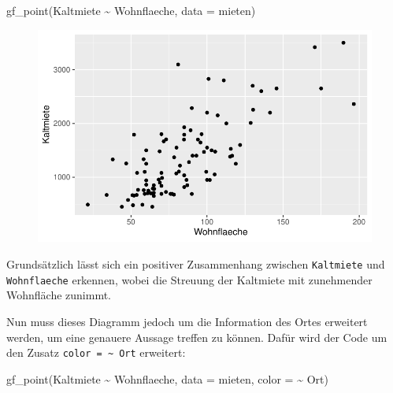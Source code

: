 \documentclass[
  a4paper,
  DIV=11]{scrartcl}
\newenvironment{Shaded}{\begin{snugshade}}{\end{snugshade}}
\newcommand{\AttributeTok}[1]{\textcolor[rgb]{0.40,0.45,0.13}{#1}}
\newcommand{\FunctionTok}[1]{\textcolor[rgb]{0.28,0.35,0.67}{#1}}
\newcommand{\NormalTok}[1]{\textcolor[rgb]{0.00,0.23,0.31}{#1}}
\newcommand{\SpecialCharTok}[1]{\textcolor[rgb]{0.37,0.37,0.37}{#1}}
\begin{document}
\begin{Shaded}
\begin{Highlighting}[]
\FunctionTok{gf\_point}\NormalTok{(Kaltmiete }\SpecialCharTok{\textasciitilde{}}\NormalTok{ Wohnflaeche, }\AttributeTok{data =}\NormalTok{ mieten)}
\end{Highlighting}
\end{Shaded}

\begin{figure}[H]

{\centering \includegraphics{Mietmodellierung_files/figure-pdf/unnamed-chunk-6-1.pdf}

}

\end{figure}

Grundsätzlich lässt sich ein positiver Zusammenhang zwischen
\texttt{Kaltmiete} und \texttt{Wohnflaeche} erkennen, wobei die Streuung
der Kaltmiete mit zunehmender Wohnfläche zunimmt.

Nun muss dieses Diagramm jedoch um die Information des Ortes erweitert
werden, um eine genauere Aussage treffen zu können. Dafür wird der Code
um den Zusatz \texttt{color\ =\ \textasciitilde{}\ Ort} erweitert:

\begin{Shaded}
\begin{Highlighting}[]
\FunctionTok{gf\_point}\NormalTok{(Kaltmiete }\SpecialCharTok{\textasciitilde{}}\NormalTok{ Wohnflaeche, }\AttributeTok{data =}\NormalTok{ mieten, }\AttributeTok{color =} \SpecialCharTok{\textasciitilde{}}\NormalTok{ Ort)}
\end{Highlighting}
\end{Shaded}
\end{document}

